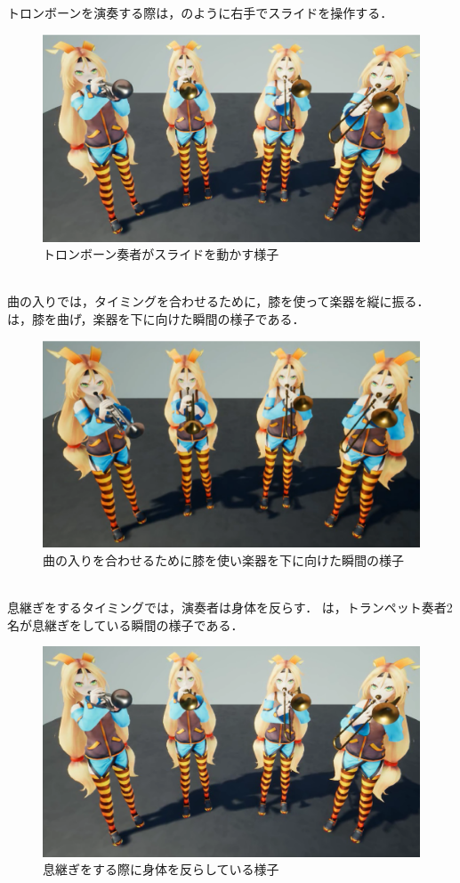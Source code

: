 \newpage
トロンボーンを演奏する際は，のように右手でスライドを操作する．
\begin{figure}[h]
	\centering
	\includegraphics[width=13cm]{fig/chap4/anim2_slide.eps}
	\caption{トロンボーン奏者がスライドを動かす様子}
	\label{fig:anim2_slide}
\end{figure}
\\
曲の入りでは，タイミングを合わせるために，膝を使って楽器を縦に振る．
は，膝を曲げ，楽器を下に向けた瞬間の様子である．
\begin{figure}[h]
	\centering
	\includegraphics[width=13cm]{fig/chap4/anim2_down.eps}
	\caption{曲の入りを合わせるために膝を使い楽器を下に向けた瞬間の様子}
	\label{fig:anim2_down}
\end{figure}
\\
息継ぎをするタイミングでは，演奏者は身体を反らす．
は，トランペット奏者2名が息継ぎをしている瞬間の様子である．
\begin{figure}[h]
	\centering
	\includegraphics[width=13cm]{fig/chap4/anim2_breath.eps}
	\caption{息継ぎをする際に身体を反らしている様子}
	\label{fig:anim2_breath}
\end{figure}
\newpage

